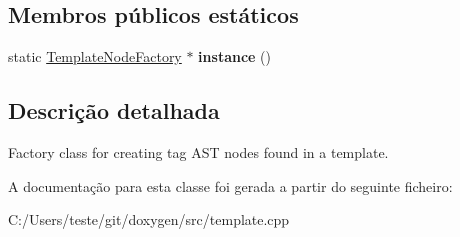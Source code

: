 \subsection*{Membros públicos estáticos}
\begin{DoxyCompactItemize}
\item 
\hypertarget{class_template_node_factory_aae936db71e4e17207821d63b87014887}{static \hyperlink{class_template_node_factory}{Template\-Node\-Factory} $\ast$ {\bfseries instance} ()}\label{class_template_node_factory_aae936db71e4e17207821d63b87014887}

\end{DoxyCompactItemize}


\subsection{Descrição detalhada}
Factory class for creating tag A\-S\-T nodes found in a template. 

A documentação para esta classe foi gerada a partir do seguinte ficheiro\-:\begin{DoxyCompactItemize}
\item 
C\-:/\-Users/teste/git/doxygen/src/template.\-cpp\end{DoxyCompactItemize}
